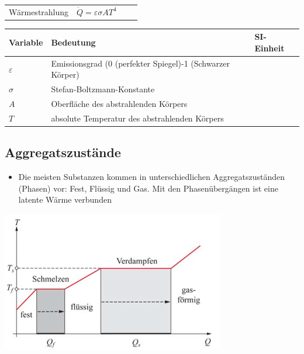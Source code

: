 \documentclass[
a4paper,
oneside,
landscape, 
8pt,
]{scrartcl}
\begin{document}
\begin{multicols*}{2}
\begin{tabbing}
	\begin{tabu} to \linewidth {l X l X}
		\toprule
		Wärmestrahlung & $\dot{Q} = \varepsilon \sigma A T ^4$  &
		 &  \\
	\end{tabu}
\end{tabbing}

\begin{tabbing}
	\begin{tabu} to \linewidth {l X l}
		Variable & Bedeutung & SI-Einheit \\
		\midrule
		$\varepsilon$ & Emissionsgrad (0 (perfekter Spiegel)-1 (Schwarzer Körper) &  \\
		$\sigma$ &  Stefan-Boltzmann-Konstante &  \\
		$A$ & Oberfläche des abstrahlenden Körpers &  \\
		$T$ & absolute Temperatur des abstrahlenden Körpers &  \\
		\bottomrule
	\end{tabu}
\end{tabbing}


\subsection{Aggregatszustände}
\begin{itemize}
	\item Die meisten Substanzen kommen in unterschiedlichen Aggregatszuständen (Phasen) vor: Fest, Flüssig und Gas. Mit den Phasenübergängen ist eine latente Wärme verbunden
\end{itemize}

\begin{minipage}[h!]{0.5\linewidth}
\includegraphics[width=0.8\linewidth]{images/aggregatszustaende}
\end{minipage}
\hfill
\begin{minipage}[h!]{0.5\linewidth}

\end{minipage}
\end{multicols*}
\end{document}

